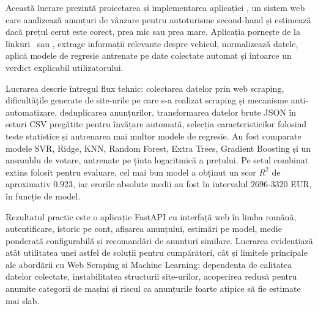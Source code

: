 Această lucrare prezintă proiectarea și implementarea aplicației \project, un sistem web care analizează anunțuri de vânzare pentru autoturisme second-hand și estimează dacă prețul cerut este corect, prea mic sau prea mare. Aplicația pornește de la linkuri \autovit\ sau \mobilede, extrage informații relevante despre vehicul, normalizează datele, aplică modele de regresie antrenate pe date colectate automat și întoarce un verdict explicabil utilizatorului.

Lucrarea descrie întregul flux tehnic: colectarea datelor prin web scraping, dificultățile generate de site-urile pe care s-a realizat scraping și mecanisme anti-automatizare, deduplicarea anunțurilor, transformarea datelor brute JSON în seturi CSV pregătite pentru învățare automată, selecția caracteristicilor folosind teste statistice și antrenarea mai multor modele de regresie. Au fost comparate modele SVR, Ridge, KNN, Random Forest, Extra Trees, Gradient Boosting și un ansamblu de votare, antrenate pe ținta logaritmică a prețului. Pe setul combinat extins folosit pentru evaluare, cel mai bun model a obținut un scor \(R^2\) de aproximativ \(0.923\), iar erorile absolute medii au fost în intervalul \(2696\)-\(3320\) EUR, în funcție de model.

Rezultatul practic este o aplicație FastAPI cu interfață web în limba română, autentificare, istoric pe cont, afișarea anunțului, estimări pe model, medie ponderată configurabilă și recomandări de anunțuri similare. Lucrarea evidențiază atât utilitatea unei astfel de soluții pentru cumpărători, cât și limitele principale ale abordării cu Web Scraping si Machine Learning: dependența de calitatea datelor colectate, instabilitatea structurii site-urilor, acoperirea redusă pentru anumite categorii de mașini și riscul ca anunțurile foarte atipice să fie estimate mai slab.
